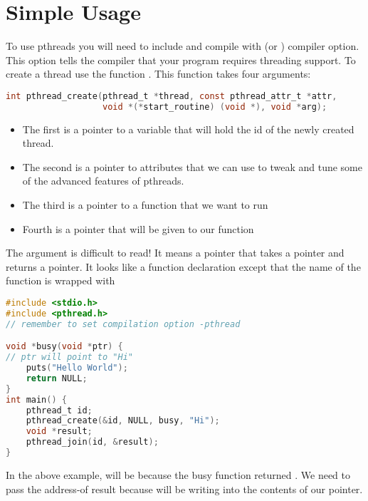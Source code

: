 \section{Simple Usage}\label{simple-usage}

To use pthreads you will need to include  and compile with  (or ) compiler option. This option tells the compiler that your program requires threading support. To create a thread use the function . This function takes four arguments:

\begin{lstlisting}[language=C]
int pthread_create(pthread_t *thread, const pthread_attr_t *attr,
                   void *(*start_routine) (void *), void *arg);
\end{lstlisting}

\begin{itemize}
\tightlist
\item
  The first is a pointer to a variable that will hold the id of the newly created thread.
\item
  The second is a pointer to attributes that we can use to tweak and tune some of the advanced features of pthreads.
\item
  The third is a pointer to a function that we want to run
\item
  Fourth is a pointer that will be given to our function
\end{itemize}

The argument  is difficult to read! It means a pointer that takes a  pointer and returns a  pointer. It looks like a function declaration except that the name of the function is wrapped with 

\begin{lstlisting}[language=C]
#include <stdio.h>
#include <pthread.h>
// remember to set compilation option -pthread

void *busy(void *ptr) {
// ptr will point to "Hi"
    puts("Hello World");
    return NULL;
}
int main() {
    pthread_t id;
    pthread_create(&id, NULL, busy, "Hi");
    void *result;
    pthread_join(id, &result);
}
\end{lstlisting}

In the above example,  will be  because the busy function returned .
We need to pass the address-of result because  will be writing into the contents of our pointer.


